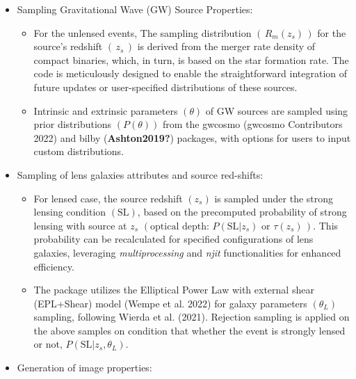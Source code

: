 \documentclass[10pt,a4paper,onecolumn]{article}
\providecommand{\tightlist}{%
  \setlength{\itemsep}{0pt}\setlength{\parskip}{0pt}}
\begin{document}
\begin{itemize}
\tightlist
\item
  Sampling Gravitational Wave (GW) Source Properties:

  \begin{itemize}
  \tightlist
  \item
    For the unlensed events, The sampling distribution
    \((\,R_m(z_s)\,)\) for the source's redshift \((\,z_s\,)\) is
    derived from the merger rate density of compact binaries, which, in
    turn, is based on the star formation rate. The code is meticulously
    designed to enable the straightforward integration of future updates
    or user-specified distributions of these sources.
  \item
    Intrinsic and extrinsic parameters \((\theta)\) of GW sources are
    sampled using prior distributions \((P(\theta))\) from the gwcosmo
    (gwcosmo Contributors 2022) and bilby (\textbf{Ashton2019?})
    packages, with options for users to input custom distributions.
  \end{itemize}
\item
  Sampling of lens galaxies attributes and source red-shifts:

  \begin{itemize}
  \tightlist
  \item
    For lensed case, the source redshift \((z_s)\) is sampled under the
    strong lensing condition \((\text{SL})\), based on the precomputed
    probability of strong lensing with source at \(z_s\)
    \((\text{optical depth: }P\left(\text{SL}|z_s\right) \text{ or }\tau(z_s)\,)\).
    This probability can be recalculated for specified configurations of
    lens galaxies, leveraging \emph{multiprocessing} and \emph{njit}
    functionalities for enhanced efficiency.
  \item
    The package utilizes the Elliptical Power Law with external shear
    (EPL+Shear) model (Wempe et al. 2022) for galaxy parameters
    \((\theta_L)\) sampling, following Wierda et al. (2021). Rejection
    sampling is applied on the above samples on condition that whether
    the event is strongly lensed or not,
    \(P\left(\text{SL}|z_s,\theta_L\right)\).
  \end{itemize}
\item
  Generation of image properties:


\end{itemize}
\end{document}
